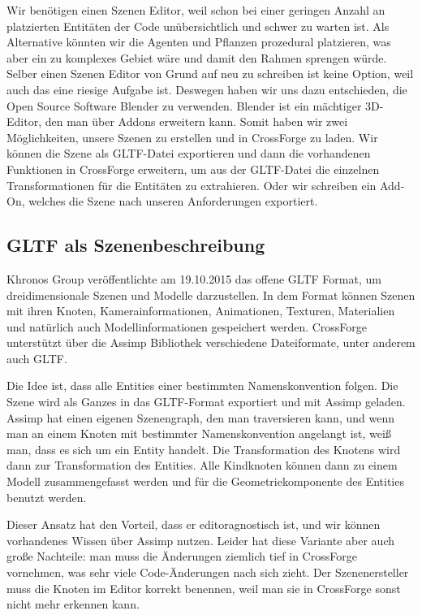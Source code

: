 Wir benötigen einen Szenen Editor, weil schon bei einer geringen Anzahl an platzierten Entitäten der Code unübersichtlich und schwer zu warten ist. Als Alternative könnten wir die Agenten und Pflanzen prozedural platzieren, was aber ein zu komplexes Gebiet wäre und damit den Rahmen sprengen würde. Selber einen Szenen Editor von Grund auf neu zu schreiben ist keine Option, weil auch das eine riesige Aufgabe ist. Deswegen haben wir uns dazu entschieden, die Open Source Software Blender zu verwenden. Blender ist ein mächtiger 3D-Editor, den man über Addons erweitern kann. Somit haben wir zwei Möglichkeiten, unsere Szenen zu erstellen und in CrossForge zu laden. Wir können die Szene als GLTF-Datei exportieren und dann die vorhandenen Funktionen in CrossForge erweitern, um aus der GLTF-Datei die einzelnen Transformationen für die Entitäten zu extrahieren. Oder wir schreiben ein Add-On, welches die Szene nach unseren Anforderungen exportiert.

\subsection{GLTF als Szenenbeschreibung}

Khronos Group veröffentlichte am 19.10.2015 das offene GLTF Format, um dreidimensionale Szenen und Modelle darzustellen. In dem Format können Szenen mit ihren Knoten, Kamerainformationen, Animationen, Texturen, Materialien und natürlich auch Modellinformationen gespeichert werden. CrossForge unterstützt über die Assimp Bibliothek verschiedene Dateiformate, unter anderem auch GLTF.

Die Idee ist, dass alle Entities einer bestimmten Namenskonvention folgen. Die Szene wird als Ganzes in das GLTF-Format exportiert und mit Assimp geladen. Assimp hat einen eigenen Szenengraph, den man traversieren kann, und wenn man an einem Knoten mit bestimmter Namenskonvention angelangt ist, weiß man, dass es sich um ein Entity handelt. Die Transformation des Knotens wird dann zur Transformation des Entities. Alle Kindknoten können dann zu einem Modell zusammengefasst werden und für die Geometriekomponente des Entities benutzt werden.

Dieser Ansatz hat den Vorteil, dass er editoragnostisch ist, und wir können vorhandenes Wissen über Assimp nutzen. Leider hat diese Variante aber auch große Nachteile: man muss die Änderungen ziemlich tief in CrossForge vornehmen, was sehr viele Code-Änderungen nach sich zieht. Der Szenenersteller muss die Knoten im Editor korrekt benennen, weil man sie in CrossForge sonst nicht mehr erkennen kann.

